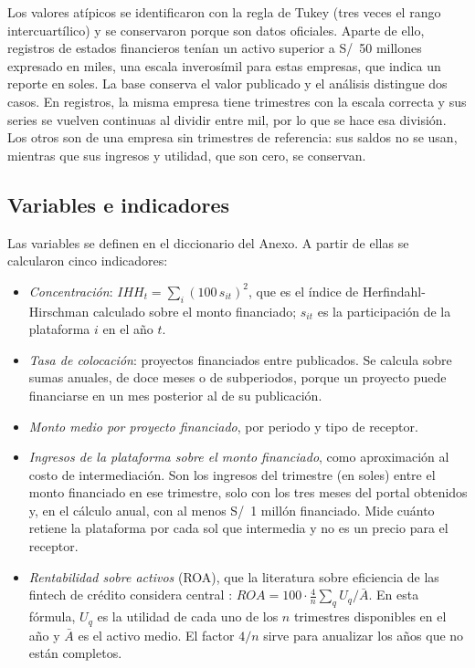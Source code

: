 Los valores atípicos se identificaron con la regla de Tukey (tres veces el rango intercuartílico) y se conservaron porque son datos oficiales. Aparte de ello,  registros de estados financieros tenían un activo superior a S/~50 millones expresado en miles, una escala inverosímil para estas empresas, que indica un reporte en soles. La base conserva el valor publicado y el análisis distingue dos casos. En  registros, la misma empresa tiene trimestres con la escala correcta y sus series se vuelven continuas al dividir entre mil, por lo que se hace esa división. Los otros  son de una empresa sin trimestres de referencia: sus saldos no se usan, mientras que sus ingresos y utilidad, que son cero, se conservan.

\subsection{Variables e indicadores}

Las variables se definen en el diccionario del Anexo. A partir de ellas se calcularon cinco indicadores:

\begin{itemize}
\item \textit{Concentración}: $\mathit{IHH}_t=\sum_i (100\,s_{it})^2$, que es el índice de Herfindahl-Hirschman calculado sobre el monto financiado; $s_{it}$ es la participación de la plataforma $i$ en el año $t$.
\item \textit{Tasa de colocación}: proyectos financiados entre publicados. Se calcula sobre sumas anuales, de doce meses o de subperiodos, porque un proyecto puede financiarse en un mes posterior al de su publicación.
\item \textit{Monto medio por proyecto financiado}, por periodo y tipo de receptor.
\item \textit{Ingresos de la plataforma sobre el monto financiado}, como aproximación al costo de intermediación. Son los ingresos del trimestre (en soles) entre el monto financiado en ese trimestre, solo con los tres meses del portal obtenidos y, en el cálculo anual, con al menos S/~1 millón financiado. Mide cuánto retiene la plataforma por cada sol que intermedia y no es un precio para el receptor.
\item \textit{Rentabilidad sobre activos} (ROA), que la literatura sobre eficiencia de las fintech de crédito considera central \parencite{onorato2024,pampurini2024}: $\mathit{ROA}=100\cdot\frac{4}{n}\sum_q U_q \big/ \bar{A}$. En esta fórmula, $U_q$ es la utilidad de cada uno de los $n$ trimestres disponibles en el año y $\bar{A}$ es el activo medio. El factor $4/n$ sirve para anualizar los años que no están completos.
\end{itemize}

